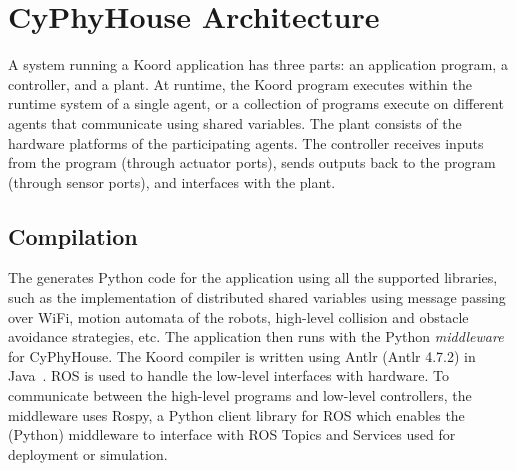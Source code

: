 \section{CyPhyHouse Architecture}
\label{sec:middleware}
\newcommand{\Shapeform}{\textit{Shapeform}\xspace}

A system running a Koord application has three parts: an application program, a controller, and a plant.
At runtime, the Koord program executes within the runtime system of a single agent, or a collection of programs execute on different agents that communicate using shared variables.
The plant consists of the hardware platforms of the participating agents.
The controller receives inputs from the program (through actuator ports), sends outputs back to the program (through sensor ports), and interfaces with the plant.

\subsection{Compilation}

The  generates Python code for the application using all the supported libraries,
such as the implementation of distributed shared variables using message passing over WiFi, motion automata of the robots, high-level collision and obstacle avoidance strategies, etc.
The application then runs with the Python \emph{middleware} for CyPhyHouse.
The Koord compiler is written using Antlr (Antlr 4.7.2) in Java~\cite{Parr:2013:DAR:2501720}.%
  ROS is used to handle the low-level interfaces with hardware.
To communicate between the high-level programs and low-level controllers, the middleware uses Rospy, a Python client library for ROS which enables the (Python) middleware to interface with ROS Topics and Services used for deployment or simulation.


